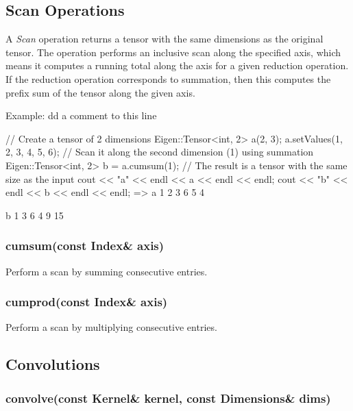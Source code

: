 \subsection*{Scan Operations}

A {\itshape Scan} operation returns a tensor with the same dimensions as the original tensor. The operation performs an inclusive scan along the specified axis, which means it computes a running total along the axis for a given reduction operation. If the reduction operation corresponds to summation, then this computes the prefix sum of the tensor along the given axis.

Example\+: dd a comment to this line \begin{DoxyVerb}// Create a tensor of 2 dimensions
Eigen::Tensor<int, 2> a(2, 3);
a.setValues({{1, 2, 3}, {4, 5, 6}});
// Scan it along the second dimension (1) using summation
Eigen::Tensor<int, 2> b = a.cumsum(1);
// The result is a tensor with the same size as the input
cout << "a" << endl << a << endl << endl;
cout << "b" << endl << b << endl << endl;
=>
a
1 2 3
6 5 4

b
1  3  6
4  9 15
\end{DoxyVerb}


\subsubsection*{cumsum(const Index\& axis)}

Perform a scan by summing consecutive entries.

\subsubsection*{cumprod(const Index\& axis)}

Perform a scan by multiplying consecutive entries.

\subsection*{Convolutions}

\subsubsection*{convolve(const Kernel\& kernel, const Dimensions\& dims)}

